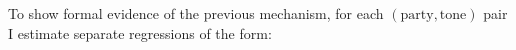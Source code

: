\documentclass[12pt]{article}
\begin{document}
	
 To show formal evidence of the previous mechanism, for each $(\text{party},\text{tone})$ pair I estimate separate regressions of the form:
	
	
	

	

\end{document}
